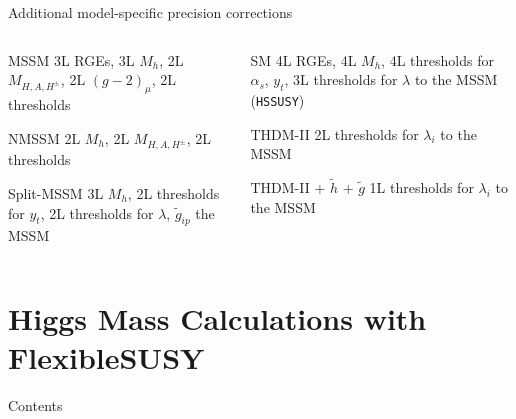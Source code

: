 \documentclass[hyperref={pdfpagelabels=false},ngerman]{beamer}
\newcommand{\as}{\alpha_s}
\begin{document}
\begin{frame}{Additional model-specific precision corrections}
  \begin{columns}[T]
    \begin{column}{0.49\textwidth}
      \begin{modelblock}{MSSM}
        3L RGEs, 3L $M_h$, 2L $M_{H,A,H^\pm}$, 2L $(g-2)_\mu$, 2L
        thresholds
      \end{modelblock}
      \begin{modelblock}{NMSSM}
        2L $M_h$, 2L $M_{H,A,H^\pm}$, 2L thresholds
      \end{modelblock}
      \begin{modelblock}{Split-MSSM}
        3L $M_h$, 2L thresholds for $y_t$, 2L thresholds for $\lambda$, $\tilde{g}_{ip}$
        the MSSM
      \end{modelblock}
    \end{column}
    \begin{column}{0.49\textwidth}
      \begin{modelblock}{SM}
        4L RGEs, 4L $M_h$, 4L thresholds for $\as$, $y_t$, 3L
        thresholds for $\lambda$ to the MSSM (\texttt{HSSUSY})
      \end{modelblock}
      \begin{modelblock}{THDM-II}
        2L thresholds for $\lambda_i$ to the MSSM
      \end{modelblock}
      \begin{modelblock}{THDM-II + $\tilde{h}$ + $\tilde{g}$}
        1L thresholds for $\lambda_i$ to the MSSM
      \end{modelblock}
    \end{column}
  \end{columns}
\end{frame}


\section{Higgs Mass Calculations with FlexibleSUSY}

\begin{frame}{Contents}
  \tableofcontents[currentsection]  
\end{frame}
\end{document}
